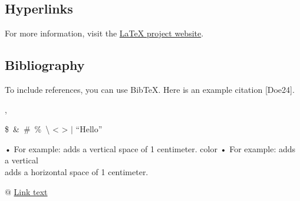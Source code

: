 \documentclass{article}
\begin{document}
	
	\subsection{Hyperlinks}
	For more information, visit the \href{http://www.example.com}{LaTeX project website}.
	 
	\subsection{Bibliography}
	To include references, you can use BibTeX. Here is an example citation [Doe24]. 
	
	
	\cite{Doe24},
	
	
	
	\$\  \&\ \#\ \%\ 
	\textbackslash
	\textless{}
	\textgreater{}
	$\vert$
	 “Hello”
	 
\vspace{1cm} 
• For example: \vspace{1cm} adds a vertical space of 1
centimeter.
\vspace{1cm} color
• For example: \vspace{1cm} adds a vertical 
	\\
	\hspace{1cm} adds a horizontal space of 1
	centimeter.
	
	
  $@$
  \href{http://www.example.com}{Link text}
  
	
	
	
	
	
	
	
	
	
\end{document}
